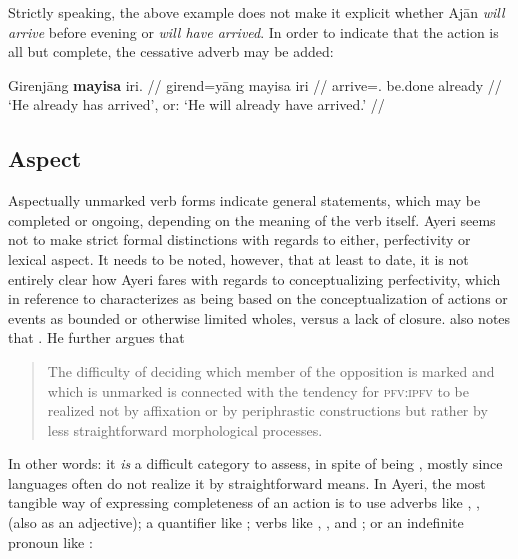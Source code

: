 Strictly speaking, the above example does not make it explicit whether Ajān 
\emph{will arrive} before evening or \emph{will have arrived}. In order to 
indicate that the action is all but complete, the cessative adverb 
 may be added:

\ex
\begingl
	\gla Girenjāng \textbf{mayisa} iri. //
	\glb girend=yāng mayisa iri //
	\glc arrive=\TsgM{}.\Aarg{} be.done already //
	\glft `He already has arrived', or: `He will already have arrived.' //
\endgl
\xe



\subsection{Aspect}
\label{subsec:aspect}

Aspectually unmarked verb forms indicate general statements, which may be
completed or ongoing, depending on the meaning of the verb itself. Ayeri seems
not to make strict formal distinctions with regards to either, perfectivity or
lexical aspect. It needs to be noted, however, that at least to date, it is not
entirely clear how Ayeri fares with regards to conceptualizing perfectivity,
which \citet[76]{dahl1985} in reference to
\citet[16]{comrie1976} characterizes as being based on the conceptualization of
actions or events as bounded or otherwise limited wholes, versus a lack of
closure. \citet{dahl1985} also notes that . He further argues that

\blockcquote[73]{dahl1985}{The difficulty of deciding which member of the
opposition is marked and which is unmarked is connected with the tendency for
\textsc{pfv:ipfv} to be realized not by affixation or by periphrastic
constructions but  rather by less straightforward morphological processes.}

In other words: it \emph{is} a difficult category to assess, in spite of being
,
mostly since languages often do not realize it by straightforward means. In
Ayeri, the most tangible way of expressing completeness of an action is to use
adverbs like , ,
 (also as an adjective); a quantifier like
; verbs like ,
, and ; or an indefinite
pronoun like :

